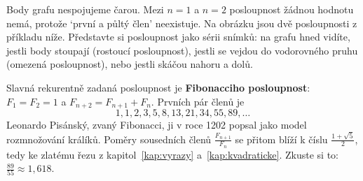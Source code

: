 \begin{center}
\end{center}

Body grafu nespojujeme čarou. Mezi $n = 1$ a $n = 2$ posloupnost žádnou hodnotu nemá, protože `první a půltý člen' neexistuje. Na obrázku jsou dvě posloupnosti z příkladu níže. Představte si posloupnost jako sérii snímků: na grafu hned vidíte, jestli body stoupají (rostoucí posloupnost), jestli se vejdou do vodorovného pruhu (omezená posloupnost), nebo jestli skáčou nahoru a dolů.

\begin{example}
  Slavná rekurentně zadaná posloupnost je \textbf{Fibonacciho posloupnost}: $F_1 = F_2 = 1$ a $F_{n+2} = F_{n+1} + F_n$. Prvních pár členů je
  \begin{equation*}
    1, 1, 2, 3, 5, 8, 13, 21, 34, 55, 89, \ldots
  \end{equation*}
  Leonardo Pisánský, zvaný Fibonacci, ji v roce 1202 popsal jako model rozmnožování králíků. Poměry sousedních členů $\frac{F_{n+1}}{F_n}$ se přitom blíží k číslu $\frac{1 + \sqrt{5}}{2}$, tedy ke zlatému řezu z kapitol~\ref{kap:vyrazy} a~\ref{kap:kvadraticke}. Zkuste si to: $\frac{89}{55}\approx 1{,}618$.
\end{example}

